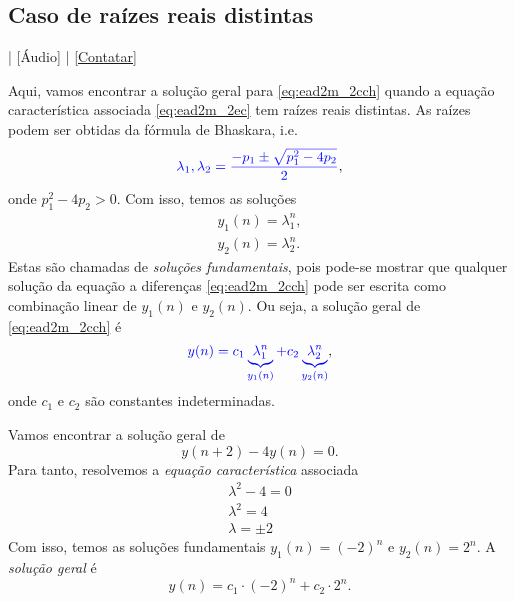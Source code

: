 \subsection{Caso de raízes reais distintas}

\begin{flushright}
  [Vídeo] | [Áudio] | \href{https://phkonzen.github.io/notas/contato.html}{[Contatar]}
\end{flushright}

Aqui, vamos encontrar a solução geral para \eqref{eq:ead2m_2cch} quando a equação característica associada \eqref{eq:ead2m_2ec} tem raízes reais distintas. As raízes podem ser obtidas da fórmula de Bhaskara, i.e.
\begin{equation}
  {\color{blue}\lambda_1,\lambda_2 = \frac{-p_1 \pm \sqrt{p_1^2-4p_2}}{2}},
\end{equation}
onde $p_1^2 - 4p_2 > 0$. Com isso, temos as soluções
\begin{gather}
  y_1(n) = \lambda_1^n,\\
  y_2(n) = \lambda_2^n.
\end{gather}
Estas são chamadas de \emph{soluções fundamentais}, pois pode-se mostrar que qualquer solução da equação a diferenças \eqref{eq:ead2m_2cch} pode ser escrita como combinação linear de $y_1(n)$ e $y_2(n)$. Ou seja, a solução geral de \eqref{eq:ead2m_2cch} é
\begin{equation}
  {\color{blue}y(n) = c_1\underbrace{\,\lambda_1^n\,}_{y_1(n)} + c_2\underbrace{\,\lambda_2^n\,}_{y_2(n)}},
\end{equation}
onde $c_1$ e $c_2$ são constantes indeterminadas.

\begin{ex}
  Vamos encontrar a solução geral de
  \begin{equation}
    y(n+2) - 4y(n) = 0.
  \end{equation}
  Para tanto, resolvemos a \emph{equação característica} associada
  \begin{gather}
    \lambda^2 - 4 = 0\\
    \lambda^2 = 4\\
    \lambda = \pm 2
  \end{gather}
  Com isso, temos as soluções fundamentais $y_1(n)=(-2)^n$ e $y_2(n)=2^n$. A \emph{solução geral} é
  \begin{equation}
    y(n) = c_1\cdot (-2)^n + c_2\cdot 2^n.
  \end{equation}
\end{ex}

